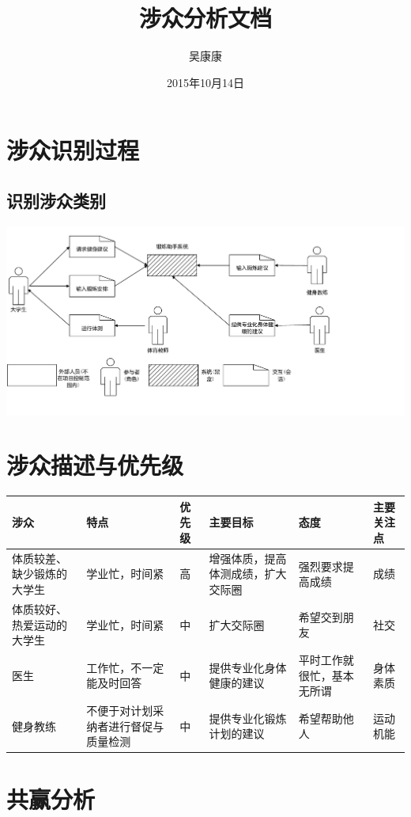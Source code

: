 \documentclass[UTF8]{ctexart}
\title{涉众分析文档}
\author{吴康康}
\date{2015年10月14日}
\begin{document}
\maketitle
\section{涉众识别过程}
\subsection{识别涉众类别}
\includegraphics[scale=0.60]{figure.pdf}
\section{涉众描述与优先级}
\centering
\begin{tabular}{|p{3cm}|p{1.8cm}|p{1.2cm}|p{2.5cm}|p{2cm}|p{2cm}|}
 \hline
涉众& 特点& 优先级& 主要目标& 态度& 主要关注点\\
 \hline
体质较差、缺少锻炼的大学生 & 学业忙，时间紧 & 高 & 增强体质，提高体测成绩，扩大交际圈 & 强烈要求提高成绩 & 成绩 \\
 \hline
体质较好、热爱运动的大学生 & 学业忙，时间紧 & 中 & 扩大交际圈 &希望交到朋友 & 社交 \\
  \hline
医生 & 工作忙，不一定能及时回答 & 中 & 提供专业化身体健康的建议 & 平时工作就很忙，基本无所谓 & 身体素质 \\
   \hline
健身教练 & 不便于对计划采纳者进行督促与质量检测 & 中 & 提供专业化锻炼计划的建议 & 希望帮助他人 & 运动机能 \\
      \hline
\end{tabular}
\section{共赢分析}
\end{document}
